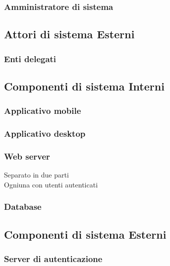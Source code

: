 \documentclass{article}
\begin{document}
\subsubsection{Amministratore di sistema}

\subsection{Attori di sistema Esterni}

\subsubsection{Enti delegati}

\subsection{Componenti di sistema Interni}
\subsubsection{Applicativo mobile}

\subsubsection{Applicativo desktop}

\subsubsection{Web server}

Separato in due parti\\
Ogniuna con utenti autenticati

\subsubsection{Database}

\subsection{Componenti di sistema Esterni}

\subsubsection{Server di autenticazione}
\end{document}
